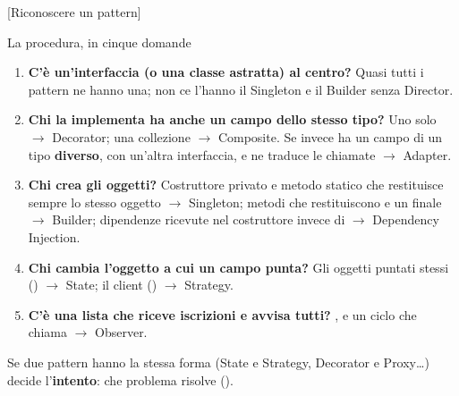 [Riconoscere un pattern]

\begin{guida}{La procedura, in cinque domande}
\begin{enumerate}[nosep, leftmargin=*]
  \item \textbf{C'è un'interfaccia (o una classe astratta) al centro?} Quasi tutti i pattern ne hanno una; non ce
        l'hanno il Singleton e il Builder senza Director.
  \item \textbf{Chi la implementa ha anche un campo dello stesso tipo?} Uno solo $\to$ Decorator; una collezione
        $\to$ Composite. Se invece ha un campo di un tipo \textbf{diverso}, con un'altra interfaccia, e ne traduce le
        chiamate $\to$ Adapter.
  \item \textbf{Chi crea gli oggetti?} Costruttore privato e metodo statico che restituisce sempre lo stesso oggetto
        $\to$ Singleton; metodi che restituiscono  e un  finale $\to$ Builder; dipendenze
        ricevute nel costruttore invece di  $\to$ Dependency Injection.
  \item \textbf{Chi cambia l'oggetto a cui un campo punta?} Gli oggetti puntati stessi () $\to$ State;
        il client () $\to$ Strategy.
  \item \textbf{C'è una lista che riceve iscrizioni e avvisa tutti?} ,  e un ciclo che chiama
         $\to$ Observer.
\end{enumerate}
Se due pattern hanno la stessa forma (State e Strategy, Decorator e Proxy\ldots) decide l'\textbf{intento}: che
problema risolve ().
\end{guida}

